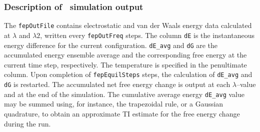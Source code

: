 \subsubsection{Description of \FEP\ simulation output }

The {\tt fepOutFile} contains electrostatic and van der Waals energy
data calculated at $\lambda$ and $\lambda2$, written every
{\tt fepOutFreq} steps. The column {\tt dE} is the instantaneous energy
difference for the current configuration. {\tt dE\_avg} and {\tt dG}
are the accumulated energy ensemble average and the corresponding
free energy at the current time step, respectively.
The temperature is specified in the penultimate column. Upon completion
of {\tt fepEquilSteps} steps, the calculation of {\tt dE\_avg} and 
{\tt dG} is restarted. The accumulated net free energy change is output
at each $\lambda$--value and at the end of the simulation. The cumulative
average energy {\tt dE\_avg} value may be summed using, for instance, the 
trapezoidal rule, or a Gaussian quadrature, to obtain an approximate 
TI estimate for the free energy change during the run.


